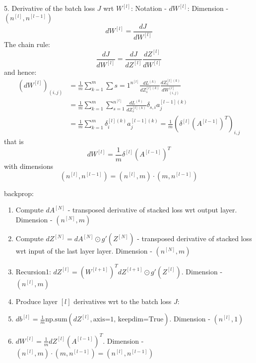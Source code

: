 \documentclass[10pt,a4paper]{article}
\begin{document}
5.   Derivative of the batch loss  $J$ wrt   $W^{[l]}$: Notation - $dW^{[l]} $:  Dimension - $(n^{[l]}, n^{[l-1]}) $   
\[dW^{[l]} = \frac{d J }{ d W^{[l]}}  \]
The chain rule:
\[   \frac{d J }{ d W^{[l]}} = \frac{d J }{ d Z^{[l]}} \frac{d Z^{[l]} }{  d W^{[l]}} \]
and hence: 
\begin{align*}
 (dW^{[l]})_{(i,j)} &=  \frac{1}{m} \sum_{k=1}^{m} \sum{s=1}^{n^{[l]}}  \frac{d L^{(k)} }{ d Z^{[l](k)}_s} \frac{ d Z^{[l](k)}_s }{ d W^{[l]}_{(i,j)}} \\
& =  \frac{1}{m} \sum_{k=1}^{m} \sum_{s=1}^{n^{[l]}}  \frac{d L^{(k)} }{ d Z^{[l](k)}_s}        \delta_{s, i }a^{[l-1](k)}_j \\
& = \frac{1}{m} \sum_{k=1}^{m} \delta^{[l](k)}_i  a^{[l-1](k)}_j = \frac{1}{m}( \delta^{[l]}   (A^{[l-1]})^T)_{i,j}
\end{align*}
that is 
\[  dW^{[l]} =  \frac{1}{m} \delta^{[l]}   (A^{[l-1]})^T\]
with dimensions 
\[ (n^{[l]},n^{[l-1]})   = (n^{[l]},m)  \cdot (m,n^{[l-1]})  \]


backprop:\\
\begin{enumerate}
\item  Compute $dA^{[N]}$ - transposed derivative of stacked loss wrt output layer. Dimension -  $(n^{[N]}, m)$\\

\item Compute $dZ^{[N]}=dA^{[N]}\odot g'(Z^{[N]})$ - transposed derivative of stacked loss wrt input of the last layer layer. Dimension -  $(n^{[N]}, m)$\\

\item Recursion1: $dZ^{[l]}= (W^{[l+1]})^T dZ^{[l+1]} \odot g'(Z^{[l]})$.  Dimension -  $(n^{[l]}, m)$\\

\item Produce layer $[l]$ derivatives wrt to the batch loss $J$:\\

\item $db^{[l]} =   \frac{1}{m}\text{np.sum}(dZ^{[l]}, \text{axis=1, keepdim=True})$.   Dimension -  $(n^{[l]}, 1)$\\

\item $  dW^{[l]} = \frac{1}{m} dZ^{[l]}  (A^{[l-1]})^T$.  Dimension -  $(n^{[l]}, m) \cdot (m,n^{[l-1]}) =(n^{[l]}, n^{[l-1]})$\\
\end{enumerate}
\end{document}
